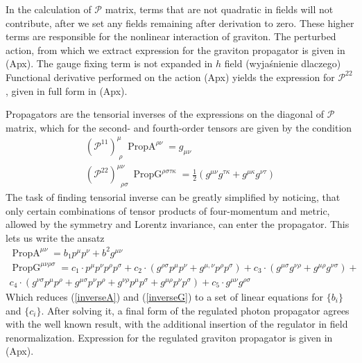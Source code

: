 \documentclass[11pt, a4paper]{article}
\begin{document}
In the calculation of $\mathcal{P}$ matrix, terms that are not quadratic in fields will not contribute, after we set any fields remaining after derivation to zero.
These higher terms are responsible for the nonlinear interaction of graviton. The perturbed action, from which we extract expression
for the graviton propagator is given in (Apx). The gauge fixing term is not expanded in $h$ field (wyjaśnienie dlaczego)
Functional derivative performed on the action (Apx) yields the expression for
$\mathcal{P}^{2 2}$, given in full form in (Apx).

Propagators are the tensorial inverses of the expressions on the diagonal of $\mathcal{P}$ matrix, which for
the second- and fourth-order tensors are given by the condition
\begin{gather}
    \left(\mathcal{P}^{1 1}\right)^{\mu}_{ \; \rho} \ \operatorname{PropA}^{\rho \nu}  = g_{\mu \nu} \label{inverseA}\\
    \left(\mathcal{P}^{2 2}\right)^{\mu\nu}_{ \; \; \rho \sigma} \ \operatorname{PropG}^{\rho \sigma \tau \kappa} = \frac{1}{2} \left( g^{\mu\nu} g^{\tau\kappa} + g^{\mu\kappa} g^{\nu\tau} \right) \label{inverseG}
\end{gather}
The task of finding tensorial inverse can be greatly simplified by noticing, that only certain combinations of tensor
products of four-momentum and metric, allowed by the symmetry and Lorentz invariance, can enter the propagator.
This lets us write the ansatz
\begin{gather}
    \operatorname{PropA}^{\mu \nu} = b_1 p^{\mu} p^{\nu} + b^2 g^{\mu\nu}\\
    \operatorname{PropG}^{\mu \nu \rho \sigma} =
    c_1 \cdot p^{\mu} p^{\nu}
   p^{\rho} p^{\sigma} + c_2 \cdot
   (g^{\rho \sigma} p^{\mu}
   p^{\nu} + g^{\mu,\nu}
   p^{\rho} p^{\sigma})+c_3 \cdot
   (g^{\mu \sigma} g^{\nu\rho} + g^{\mu \rho}
   g^{\nu\sigma})+ \\ c_4 \cdot (g^{\nu\sigma}
   p^{\mu}
   p^{\rho}+g^{\mu\sigma}
   p^{\nu}
   p^{\rho} +g^{\nu\rho}
   p^{\mu}
   p^{\sigma}+g^{\mu\rho}
   p^{\nu} p^{\sigma})+c_5 \cdot
   g^{\mu \nu} g^{\rho\sigma}
\end{gather}
Which reduces (\ref*{inverseA}) and (\ref*{inverseG}) to a set of linear equations for $\{b_i\}$ and $\{c_i\}$.
After solving it, a final form of the regulated photon propagator agrees with the well known result, with the additional insertion of the regulator in field renormalization.
Expression for the regulated graviton propagator is given in (Apx).
\end{document}
